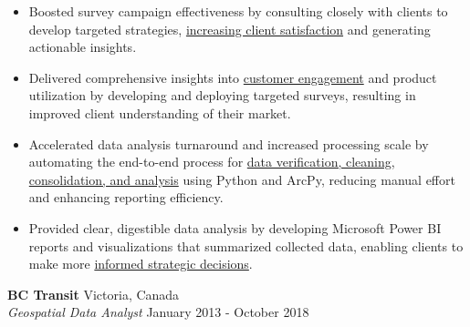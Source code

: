 \documentclass[letterpaper]{article}
\newcommand{\employer}[4]{
        \vspace{3pt}
        \textbf{#1}  %
        \hfill #2\\  %
        \textit{#3}  %
        \hfill #4\\  %
        \vspace{3mm}
    }
\newenvironment{jobtasklist}
        {
            \vspace{-12pt}
            \begin{itemize} \itemsep 0pt
        }{
            \end{itemize}
            \vspace{-3pt}
        }
\newcommand{\impt}[1]{\uline{#1}}
\begin{document}
\begin{jobtasklist}
%
%
%
%

        \item Boosted survey campaign effectiveness by consulting closely with clients to develop targeted
                strategies, \impt{increasing client satisfaction} and generating actionable insights.
        \item Delivered comprehensive insights into \impt{customer engagement} and product utilization by developing
                and deploying targeted surveys, resulting in improved client understanding of their market.
        \item Accelerated data analysis turnaround and increased processing scale by automating the end-to-end process for
                \impt{data verification, cleaning, consolidation, and analysis}
                using Python and ArcPy, reducing manual effort and enhancing reporting efficiency.
        \item Provided clear, digestible data analysis by developing Microsoft Power BI
                reports and visualizations that summarized collected data, enabling
                clients to make more \impt{informed strategic decisions}.
\end{jobtasklist}


\employer
    {BC Transit}
    {Victoria, Canada}
    {Geospatial Data Analyst}
    {January 2013 - October 2018}
\end{document}
